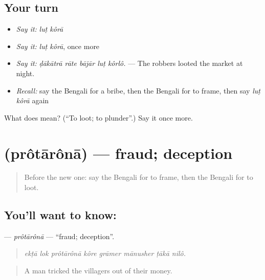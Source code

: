 \subsection*{Your turn}
\begin{itemize}
\raggedright
  \item \emph{Say it:} \emph{luṭ kôrā}
  \item \emph{Say it:} \emph{luṭ kôrā}, once more
  \item \emph{Say it:} \emph{ḍākātrā rāte bājār luṭ kôrlô.} — The robbers looted the market at night.
  \item \emph{Recall:} say the Bengali for a bribe, then the Bengali for to frame, then say \emph{luṭ kôrā} again
\end{itemize}

\begin{tcolorbox}[breakable,colback=teal!4,colframe=teal!35!black,title={Before you move on}]
What does   mean? (\textquotedblleft{}To loot; to plunder\textquotedblright{}.) Say it once more.
\end{tcolorbox}
\section[\texorpdfstring{\bn{প্রতারণা} (prôtārônā)}{প্রতারণা (prôtārônā)}]{ (prôtārônā) — fraud; deception}

\label{lesson:BN-C285-protarona}



\begin{quote}
Before the new one: say the Bengali for to frame, then the Bengali for to loot.
\end{quote}

\subsection*{You'll want to know: }
\textbf{} — \emph{prôtārônā} — \textquotedblleft{}fraud; deception\textquotedblright{}.

\begin{quote}
       
\end{quote}

\begin{quote}
\emph{ekṭā lok prôtārônā kôre grāmer mānusher ṭākā nilô.}
\end{quote}

\begin{quote}
A man tricked the villagers out of their money.
\end{quote}

